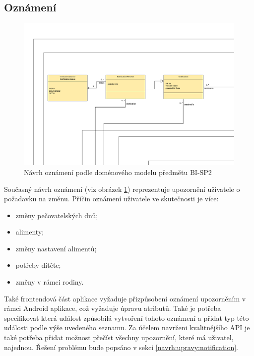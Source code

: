      \subsection{Oznámení}
        \begin{figure}\centering
            \includegraphics[width=1.0\textwidth]{pdfs/Notification1}
            \caption[Předchozí návrh oznámení]{Návrh oznámení podle doménového modelu předmětu BI-SP2}\label{image:notification1}
        \end{figure}
        Současný návrh oznámení (viz obrázek \ref{image:notification1}) reprezentuje upozornění uživatele o požadavku na změnu. Příčin oznámení uživatele ve skutečnosti je více:
        \begin{itemize}
            \item změny pečovatelských dnů;
            \item alimenty;
            \item změny nastavení alimentů;
            \item potřeby dítěte;
            \item změny v rámci rodiny.
        \end{itemize}
        Také frontendová část aplikace vyžaduje přizpůsobení oznámení upozorněním v rámci Android aplikace, což vyžaduje úpravu atributů. Také je potřeba specifikovat která událost způsobilá vytvoření tohoto oznámení a přidat typ této události podle výše uvedeného seznamu. Za účelem navrženi kvalitnějšího API je také potřeba přidat možnost přečíst všechny upozornění, které má uživatel, najednou. Řešení problému bude popsáno v sekci \ref{navrh:upravy:notification}.
        
            
            
